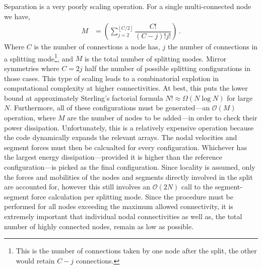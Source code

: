 Separation is a very poorly scaling operation. For a single multi-connected node we have,
\begin{align}
    M & = \left(\sum\limits_{j=2}^{\left\lfloor C/2 \right\rfloor} \dfrac{C!}{(C-j)! j!}\right)\,.
\end{align}
Where $C$ is the number of connections a node has, $j$ the number of connections in a splitting mode\footnote{This is the number of connections taken by one node after the split, the other would retain $C-j$ connections.}, and $M$ is the total number of splitting modes. Mirror symmetries where $C = 2j$ half the number of possible splitting configurations in those cases. This type of scaling leads to a combinatorial explotion in computational complexity at higher connectivities. At best, this puts the lower bound at approximately Sterling's factorial formula $N! \approx \Omega(N\log{N})$ for large $N$. Furthermore, all of these configurations must be generated---an $\mathcal{O}(M)$ operation, where $M$ are the number of nodes to be added---in order to check their power dissipation. Unfortunately, this is a relatively expensive operation because the code dynamically expands the relevant arrays. The nodal velocities and segment forces must then be calcualted for every configuration. Whichever has the largest energy dissipation---provided it is higher than the reference configuration---is picked as the final configuration. Since locality is assumed, only the forces and mobilities of the nodes and segments directly involved in the split are accounted for, however this still involves an $\mathcal{O}(2 N)$ call to the segment-segment force calculation per splitting mode. Since the procedure must be performed for all nodes exceeding the maximum allowed connectivity, it is extremely important that individual nodal connectivities as well as, the total number of highly connected nodes, remain as low as possible.

